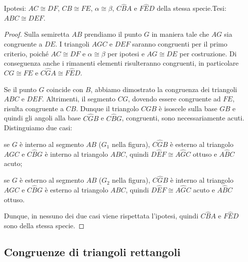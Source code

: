 \noindent Ipotesi: \(AC\cong DF\), \(CB\cong FE\), \(\alpha\cong \beta\), 
\(C\widehat{B}A\) e \(F\widehat{E}D\) della stessa specie.\tab Tesi: 
\(ABC\cong DEF\).


\begin{inaccessibleblock}
 \begin{figure}[htb]
\centering
\end{figure}
\end{inaccessibleblock}

\begin{proof}
Sulla semiretta \(AB\) prendiamo il punto \(G\) in maniera tale che \(AG\) 
sia congruente a \(DE\). I triangoli \(AGC\) e \(DEF\) saranno congruenti 
per il primo criterio, poiché \(AC\cong DF\) e \(\alpha\cong \beta\) per 
ipotesi e \(AG\cong DE\) per costruzione. Di conseguenza anche i 
rimanenti elementi risulteranno congruenti, in particolare \(CG\cong 
FE\) e \(C\widehat{G}A\cong F\widehat{E}D\).

Se il punto \(G\) coincide con \(B\), abbiamo dimostrato la congruenza 
dei triangoli \(ABC\) e \(DEF\). Altrimenti, il segmento \(CG\), dovendo 
essere congruente ad \(FE\), risulta congruente a \(CB\). Dunque il 
triangolo \(CGB\) è isoscele sulla base \(GB\) e quindi gli angoli alla 
base \(C\widehat{G}B\) e \(C\widehat{B}G\), congruenti, sono 
necessariamente acuti. Distinguiamo due casi:
\begin{itemize*}
\item se \(G\) è interno al segmento \(AB\) (\(G_1\) nella figura), 
\(C\widehat{G}B\) è esterno al triangolo \(AGC\) e \(C\widehat{B}G\) è 
interno al triangolo \(ABC\), quindi \(D\widehat{E}F\cong A\widehat{G}C\) 
ottuso e \(A\widehat{B}C\) acuto;
\item se \(G\) è esterno al segmento \(AB\) (\(G_2\) nella figura), 
\(C\widehat{G}B\) è interno al triangolo \(AGC\) e \(C\widehat{B}G\) è 
esterno al triangolo \(ABC\), quindi \(D\widehat{E}F\cong A\widehat{G}C\) 
acuto e \(A\widehat{B}C\) ottuso.
\end{itemize*}
Dunque, in nessuno dei due casi viene rispettata l'ipotesi, quindi 
\(C\widehat{B}A\) e \(F\widehat{E}D\) sono della stessa specie.
\end{proof}

\subsection{Congruenze di triangoli rettangoli}

